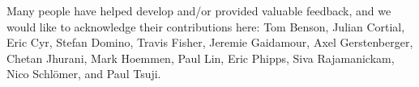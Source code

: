 Many people have helped develop \muelu{} and/or provided valuable feedback, and
we would like to acknowledge their contributions here: Tom Benson, Julian
Cortial, Eric Cyr, Stefan Domino, Travis Fisher, Jeremie Gaidamour, Axel
Gerstenberger, Chetan Jhurani, Mark Hoemmen, Paul Lin, Eric Phipps, Siva
Rajamanickam, Nico Schl{\"o}mer, and Paul Tsuji.

